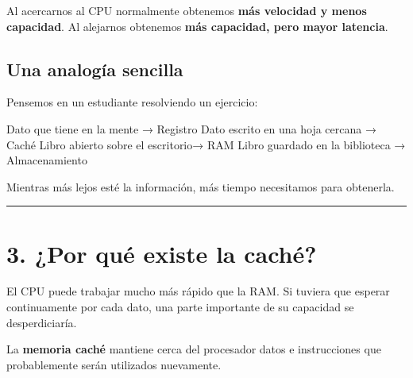 \documentclass[
  spanish,
  letterpaper,
]{scrbook}
\newenvironment{Shaded}{\begin{snugshade}}{\end{snugshade}}
\newcommand{\NormalTok}[1]{\textcolor[rgb]{0.00,0.23,0.31}{#1}}
\begin{document}
\begin{tcolorbox}[enhanced jigsaw, arc=.35mm, bottomrule=.15mm, bottomtitle=1mm, breakable, colback=white, colbacktitle=quarto-callout-important-color!10!white, colframe=quarto-callout-important-color-frame, coltitle=black, left=2mm, leftrule=.75mm, opacityback=0, opacitybacktitle=0.6, rightrule=.15mm, title=\textcolor{quarto-callout-important-color}{\faExclamation}\hspace{0.5em}{Una relación que conviene recordar}, titlerule=0mm, toprule=.15mm, toptitle=1mm]

Al acercarnos al CPU normalmente obtenemos \textbf{más velocidad y menos
capacidad}. Al alejarnos obtenemos \textbf{más capacidad, pero mayor
latencia}.

\end{tcolorbox}

\section{Una analogía sencilla}\label{una-analoguxeda-sencilla}

Pensemos en un estudiante resolviendo un ejercicio:

\begin{Shaded}
\begin{Highlighting}[]
\NormalTok{Dato que tiene en la mente       → Registro}
\NormalTok{Dato escrito en una hoja cercana → Caché}
\NormalTok{Libro abierto sobre el escritorio→ RAM}
\NormalTok{Libro guardado en la biblioteca  → Almacenamiento}
\end{Highlighting}
\end{Shaded}

Mientras más lejos esté la información, más tiempo necesitamos para
obtenerla.

\begin{center}\rule{0.5\linewidth}{0.5pt}\end{center}


\chapter{3. ¿Por qué existe la
caché?}\label{por-quuxe9-existe-la-cachuxe9}

El CPU puede trabajar mucho más rápido que la RAM. Si tuviera que
esperar continuamente por cada dato, una parte importante de su
capacidad se desperdiciaría.

La \textbf{memoria caché} mantiene cerca del procesador datos e
instrucciones que probablemente serán utilizados nuevamente.
\end{document}

